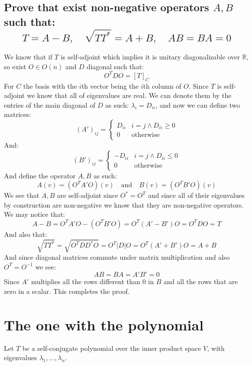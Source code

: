 \documentclass[11pt,a4paper]{article}
\theoremstyle{plain}
\newcommand{\R}{\mathbb{R}}
\begin{document}
	\subsection{Prove that exist non-negative operators $A,B$ such that:
	\[
		T = A-B,\quad \sqrt{TT^{*}}=A+B,\quad AB=BA=0
	\]}
	We know that if $T$ is self-adjoint which implies it is unitary 
	diagonalizable over $\R$, so exist $O\in O(n)$ and $D$ diagonal such that:
	\[
		O^{T}DO = [T]_C
	\]
	For $C$ the basis with the $i$th vector being the $i$th column of $O$.
	Since $T$ is self-adjoint we know that all of eigenvalues are real.
	We can denote them by the entries of the main diagonal of $D$ as such:
	$\lambda_i = D_{ii}$, and now we can define two matrices:
	\[
		(A')_{ij} = 
		\begin{cases}
			D_{ii} & i=j \land D_{ii} \geq 0 \\
			0 & \text{otherwise}
		\end{cases}
	\]
	And:
	\[
		(B')_{ij} = 
		\begin{cases}
			-D_{ii} & i=j \land D_{ii} \leq 0 \\
			0 & \text{otherwise}
		\end{cases}
	\]
	And define the operator $A,B$ as such:
	\[
		A(v) = (O^{T} A' O)(v) \quad\text{and}\quad B(v) = (O^{T} B' O)(v)
	\]
	We see that $A,B$ are self-adjoint since $O^* = O^{T}$ and since all of
	their eigenvalues by construction are non-negative we know that they are
	non-negative operators. We may notice that:
	\[
		A - B = O^{T} A' O - (O^{T} B' O) = O^{T} (A'-B') O = O^{T} D O = T
	\]
	And also that:
	\[
		\sqrt{TT^*} = \sqrt{O^{T} DD^* O} = O^{T} |D| O = O^{T} (A'+B') O = 
		A+B
	\]
	And since diagonal matrices commute under matrix multiplication and also
	$O^{T} = O^{-1}$ we see:
	\[
		AB = BA = A'B' = 0
	\]
	Since $A'$ multiplies all the rows different than $0$ in $B$ and all the rows
	that are zero in a scalar. This completes the proof.
	
	\newpage
	\section{The one with the polynomial}
	Let $T$ be a self-conjugate polynomial over the inner product space $V$, 
	with eigenvalues $\lambda_1,\dots,\lambda_n$.
\end{document}
